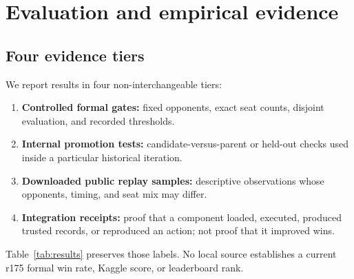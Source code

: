 \documentclass[10pt]{article}
\begin{document}
\section{Evaluation and empirical evidence}

\subsection{Four evidence tiers}

We report results in four non-interchangeable tiers:

\begin{enumerate}
\item \textbf{Controlled formal gates:} fixed opponents, exact seat counts, disjoint evaluation, and recorded thresholds.
\item \textbf{Internal promotion tests:} candidate-versus-parent or held-out checks used inside a particular historical iteration.
\item \textbf{Downloaded public replay samples:} descriptive observations whose opponents, timing, and seat mix may differ.
\item \textbf{Integration receipts:} proof that a component loaded, executed, produced trusted records, or reproduced an action; not proof that it improved wins.
\end{enumerate}

Table~\ref{tab:results} preserves those labels. No local source establishes a current r175 formal win rate, Kaggle score, or leaderboard rank.
\end{document}
